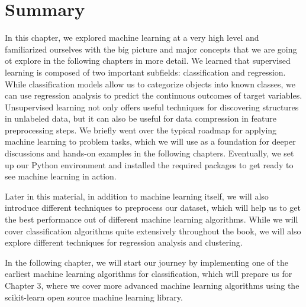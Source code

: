 \documentclass[11pt]{article}
\begin{document}
    \section{Summary}\label{summary}

    In this chapter, we explored machine learning at a very high level and
familiarized ourselves with the big picture and major concepts that we
are going ot explore in the following chapters in more detail. We
learned that supervised learning is composed of two important subfields:
classification and regression. While classification models allow us to
categorize objects into known classes, we can use regression analysis to
predict the continuous outcomes of target variables. Unsupervised
learning not only offers useful techniques for discovering structures in
unlabeled data, but it can also be useful for data compression in
feature preprocessing steps. We briefly went over the typical roadmap
for applying machine learning to problem tasks, which we will use as a
foundation for deeper discussions and hands-on examples in the following
chapters. Eventually, we set up our Python environment and installed the
required packages to get ready to see machine learning in action.

    Later in this material, in addition to machine learning itself, we will
also introduce different techniques to preprocess our dataset, which
will help us to get the best performance out of different machine
learning algorithms. While we will cover classification algorithms quite
extensively throughout the book, we will also explore different
techniques for regression analysis and clustering.

    In the following chapter, we will start our journey by implementing one
of the earliest machine learning algorithms for classification, which
will prepare us for Chapter 3, where we cover more advanced machine
learning algorithms using the scikit-learn open source machine learning
library.


    
    
    
    
\end{document}
